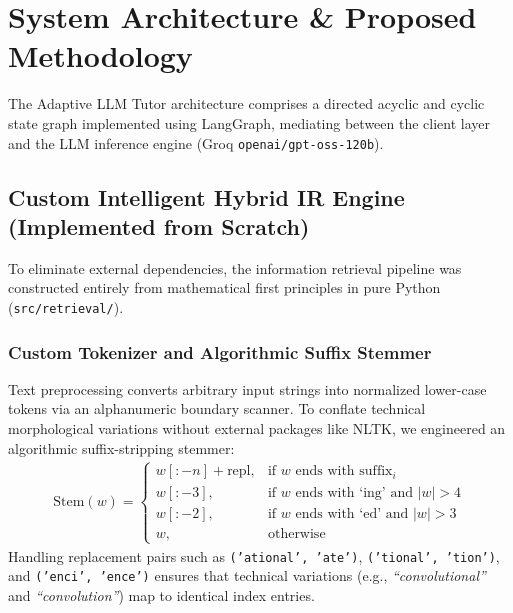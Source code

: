 \documentclass[conference]{IEEEtran}
\begin{document}
\section{System Architecture \& Proposed Methodology}
The Adaptive LLM Tutor architecture comprises a directed acyclic and cyclic state graph implemented using LangGraph, mediating between the client layer and the LLM inference engine (Groq \texttt{openai/gpt-oss-120b}).

\subsection{Custom Intelligent Hybrid IR Engine (Implemented from Scratch)}
To eliminate external dependencies, the information retrieval pipeline was constructed entirely from mathematical first principles in pure Python (\texttt{src/retrieval/}).

\subsubsection{Custom Tokenizer and Algorithmic Suffix Stemmer}
Text preprocessing converts arbitrary input strings into normalized lower-case tokens via an alphanumeric boundary scanner. To conflate technical morphological variations without external packages like NLTK, we engineered an algorithmic suffix-stripping stemmer:
\begin{align}
\text{Stem}(w) = 
\begin{cases}
w[:-n] + \text{repl}, & \text{if } w \text{ ends with } \text{suffix}_i \\
w[:-3], & \text{if } w \text{ ends with `ing' and } |w| > 4 \\
w[:-2], & \text{if } w \text{ ends with `ed' and } |w| > 3 \\
w, & \text{otherwise}
\end{cases}
\end{align}
Handling replacement pairs such as \texttt{('ational', 'ate')}, \texttt{('tional', 'tion')}, and \texttt{('enci', 'ence')} ensures that technical variations (e.g., \textit{``convolutional''} and \textit{``convolution''}) map to identical index entries.
\end{document}
